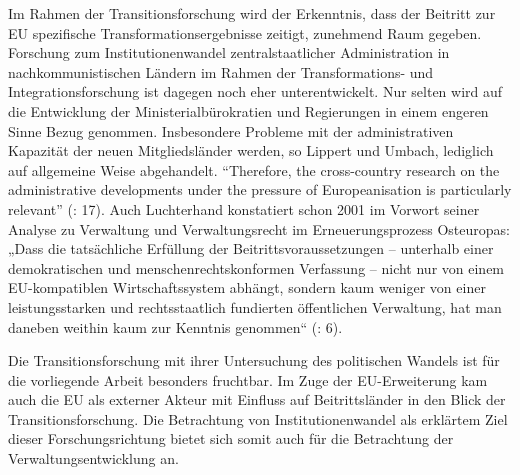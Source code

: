 Im Rahmen der Transitionsforschung wird der Erkenntnis, dass der Beitritt zur EU spezifische Transformationsergebnisse zeitigt, zunehmend Raum gegeben. Forschung zum Institutionenwandel zentralstaatlicher Administration in nachkommunistischen Ländern im Rahmen der Transformations- und Integrationsforschung ist dagegen noch eher unterentwickelt. Nur selten wird auf die Entwicklung der Ministerialbürokratien und Regierungen in einem engeren Sinne Bezug genommen. Insbesondere Probleme mit der administrativen Kapazität der neuen Mitgliedsländer werden, so Lippert und Umbach, lediglich auf allgemeine Weise abgehandelt. “Therefore, the cross-country research on the administrative developments under the pressure of Europeanisation is particularly relevant” (\cite{lipumb05}: 17). Auch Luchterhand konstatiert schon 2001 im Vorwort seiner Analyse zu Verwaltung und Verwaltungsrecht im Erneuerungsprozess Osteuropas: „Dass die tatsächliche Erfüllung der Beitrittsvoraussetzungen – unterhalb einer demokratischen und menschenrechtskonformen Verfassung – nicht nur von einem EU-kompatiblen Wirtschaftssystem abhängt, sondern kaum weniger von einer leistungsstarken und rechtsstaatlich fundierten öffentlichen Verwaltung, hat man daneben weithin kaum zur Kenntnis genommen“ (\cite{lucht}: 6).\par
Die Transitionsforschung mit ihrer Untersuchung des politischen Wandels ist für die vorliegende Arbeit besonders fruchtbar. Im Zuge der EU-Erweiterung kam auch die EU als externer Akteur mit Einfluss auf Beitrittsländer in den Blick der Transitionsforschung. Die Betrachtung von Institutionenwandel als erklärtem Ziel dieser Forschungsrichtung bietet sich somit auch für die Betrachtung der Verwaltungsentwicklung an. 
